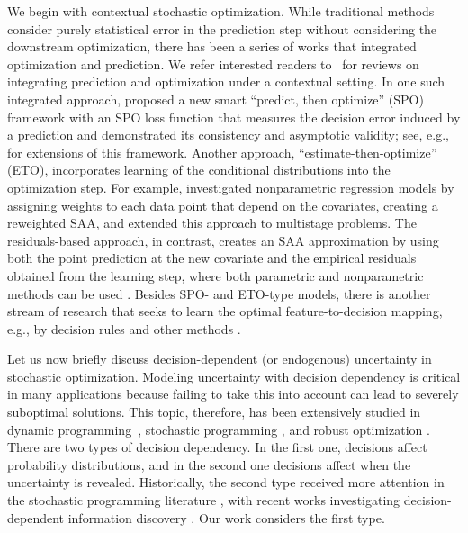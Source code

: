 \documentclass[onefignum,onetabnum]{siamart251216}
\newcounter{example}
\begin{document}
We begin with contextual stochastic optimization.
While traditional methods consider purely statistical error in the prediction step without considering the downstream optimization, there has been a series of works that integrated optimization and prediction. We refer interested readers to~\cite{qi2022integrating, sadana2024survey} for reviews on integrating prediction and optimization under a contextual setting.
%
In one such integrated approach, \cite{elmachtoub2022smart} proposed a new smart ``predict, then optimize'' (SPO) framework with an SPO loss function that measures the decision error induced by a prediction and demonstrated its consistency and asymptotic validity; see, e.g., \cite{el2019generalization,estes2023smart,kallus2023stochastic} for extensions of this framework. 
%
Another approach, ``estimate-then-optimize'' (ETO),  incorporates learning of the conditional distributions into the optimization step.  
For example, \cite{bertsimas2020predictive} investigated nonparametric regression models by assigning weights to each data point that depend on the covariates, creating a reweighted SAA, and \cite{bertsimas2019dynamic} extended this approach to multistage problems. 
The residuals-based approach, in contrast, creates an SAA approximation by using both the point prediction at the new covariate and the empirical residuals obtained from the learning step, where both parametric and nonparametric methods can be used \cite{ban2019dynamic,sen2018learning,kannan2025data,kannan2020residuals}. 
%
Besides SPO- and ETO-type models, there is another stream of research that seeks to learn the optimal feature-to-decision mapping, e.g., by decision rules and other methods \cite[e.g.,][]{bertsimas2022data,ban2019big,oroojlooyjadid2020applying,qi2020learning,zhang2024optimal}.


Let us now briefly discuss decision-dependent (or endogenous) uncertainty in stochastic optimization. 
Modeling uncertainty with decision dependency is critical in many applications because failing to take this into account can lead to severely suboptimal solutions. This topic, therefore, has been extensively studied %
in %
 dynamic programming~\citep[e.g.,][]{webster2012approximate}, stochastic programming \citep[e.g.,][]{goel2006class,hellemoetal18, lee2012newsvendor}, and robust optimization \citep[e.g.,][]{nohadani2018optimization, poss2013robust}. 
There are two types of decision dependency. In the first one, decisions affect probability distributions, and in the second one decisions affect when the uncertainty is revealed. Historically, the second type received more attention in the stochastic programming literature \citep[e.g.,][]{goel2006class}, with recent works investigating decision-dependent information discovery \citep{vayanos2011decision,vayanos2026robust}. 
Our work considers the first type. %
\end{document}
